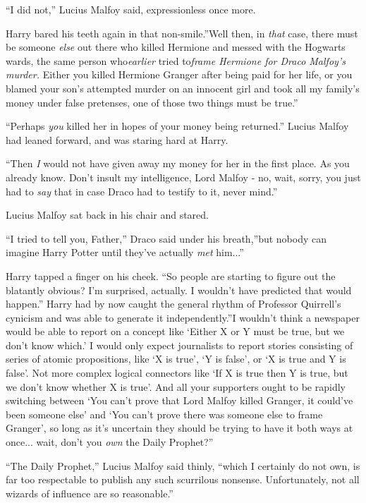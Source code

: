 ``I did not,'' Lucius Malfoy said, expressionless once more.

Harry bared his teeth again in that non-smile.''Well then, in
\emph{that} case, there must be someone \emph{else} out there who killed
Hermione and messed with the Hogwarts wards, the same person
who\emph{earlier} tried to\emph{frame Hermione for Draco Malfoy's
murder.} Either you killed Hermione Granger after being paid for her
life, or you blamed your son's attempted murder on an innocent girl and
took all my family's money under false pretenses, one of those two
things must be true.''

``Perhaps \emph{you} killed her in hopes of your money being returned.''
Lucius Malfoy had leaned forward, and was staring hard at Harry.

``Then \emph{I} would not have given away my money for her in the first
place. As you already know. Don't insult my intelligence, Lord Malfoy -
no, wait, sorry, you just had to \emph{say} that in case Draco had to
testify to it, never mind.''

Lucius Malfoy sat back in his chair and stared.

``I tried to tell you, Father,'' Draco said under his breath,''but
nobody can imagine Harry Potter until they've actually \emph{met}
him...''

Harry tapped a finger on his cheek. ``So people are starting to figure
out the blatantly obvious? I'm surprised, actually. I wouldn't have
predicted that would happen.'' Harry had by now caught the general
rhythm of Professor Quirrell's cynicism and was able to generate it
independently.''I wouldn't think a newspaper would be able to report on
a concept like `Either X or Y must be true, but we don't know which.' I
would only expect journalists to report stories consisting of series of
atomic propositions, like `X is true', `Y is false', or `X is true and Y
is false'. Not more complex logical connectors like `If X is true then Y
is true, but we don't know whether X is true'. And all your supporters
ought to be rapidly switching between `You can't prove that Lord Malfoy
killed Granger, it could've been someone else' and `You can't prove
there was someone else to frame Granger', so long as it's uncertain they
should be trying to have it both ways at once... wait, don't you
\emph{own} the Daily Prophet?''

``The Daily Prophet,'' Lucius Malfoy said thinly, ``which I certainly do
not own, is far too respectable to publish any such scurrilous nonsense.
Unfortunately, not all wizards of influence are so reasonable.''

